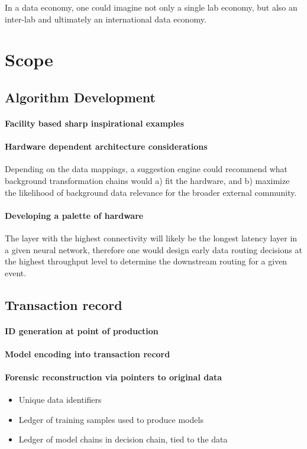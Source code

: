 \documentclass{article}
\begin{document}
In a data economy, one could imagine not only a single lab economy, but also an inter-lab and ultimately an international data economy.



\section{Scope}

\subsection{Algorithm Development}
\paragraph{Facility based sharp inspirational examples}
\paragraph{Hardware dependent architecture considerations}
Depending on the data mappings, a suggestion engine could recommend what background transformation chains would a) fit the hardware, and b) maximize the likelihood of background data relevance for the broader external community.

\paragraph{Developing a palette of hardware}
The layer with the highest connectivity will likely be the longest latency layer in a given neural network, therefore one would design early data routing decisions at the highest throughput level to determine the downstream routing for a given event.  

\subsection{Transaction record}
\paragraph{ID generation at point of production}
\paragraph{Model encoding into transaction record}
\paragraph{Forensic reconstruction via pointers to original data}
\begin{itemize}
\item Unique data identifiers
\item Ledger of training samples used to produce models
\item Ledger of model chains in decision chain, tied to the data
\end{itemize}
\end{document}
